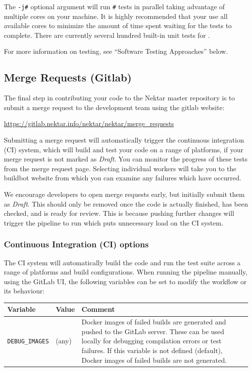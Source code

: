 The \lstinline{-j#} optional argument will run \lstinline{#} tests in parallel
taking advantage of multiple cores on your machine.  It is highly
recommended that your use all available cores to minimize the amount
of time spent waiting for the tests to complete. There are currently
several hundred built-in unit tests for {\nek}.

For more information on testing, see ``Software Testing Approaches'' below.

\subsection{Merge Requests (Gitlab)}
The final step in contributing your code to the
Nektar master repository is to submit a merge request to the
development team using the {\nek} gitlab website:
  
\url{https://gitlab.nektar.info/nektar/nektar/merge\_requests}
  
Submitting a merge request will automatically trigger the continuous integration (CI) system, which will build and test your code on a range of platforms, if your merge request is not marked as \emph{Draft}. You can monitor the progress of these tests from the merge request page. Selecting individual workers will take you to the buildbot website from which you can examine any failures which have occurred.

\begin{tipbox}
	We encourage developers to open merge requests early, but initially submit them as \emph{Draft}. This should only be removed once the code is actually finished, has been checked, and is ready for review. This is because pushing further changes will trigger the pipeline to run which puts unnecessary load on the CI system.
\end{tipbox}

\subsubsection{Continuous Integration (CI) options}
The CI system will automatically build the code and run the test suite across a range of platforms and build configurations. When running the pipeline manually, using the GitLab UI, the following variables can be set to modify the workflow or its behaviour:

\begin{tabularx}{\textwidth}{llX}
\hline
Variable & Value & Comment \\
\hline
    \texttt{DEBUG\_IMAGES} & (any) & Docker images of failed builds are
    generated and pushed to the GitLab server. These can be used locally for
    debugging compilation errors or test failures. \newline
    If this variable is not defined (default), Docker images of failed builds
    are not generated. \\
\hline
\end{tabularx}


